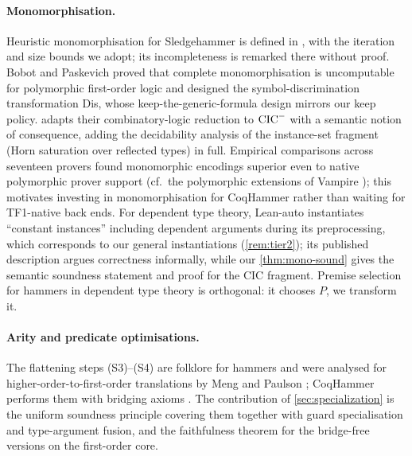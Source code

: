 \paragraph{Monomorphisation.}
Heuristic monomorphisation for Sledgehammer is defined in
\cite[\S5.6, \S7.1]{Blanchette2016}, with the iteration and size
bounds we adopt; its incompleteness is remarked there without
proof.  Bobot and Paskevich \cite{BobotPaskevich2011} proved that
complete monomorphisation is uncomputable for polymorphic
first-order logic and designed the symbol-discrimination
transformation \textsf{Dis}, whose keep-the-generic-formula design
mirrors our keep policy.   adapts their
combinatory-logic reduction to $\mathrm{CIC}^{-}$ with a semantic notion of
consequence, adding the decidability analysis of the instance-set
fragment (Horn saturation over reflected types) in full.  Empirical
comparisons across seventeen provers \cite{Desharnais2022} found
monomorphic encodings superior even to native polymorphic prover
support (cf.\ the polymorphic extensions of Vampire
\cite{BhayatReger2020}); this motivates investing in
monomorphisation for CoqHammer rather than waiting for TF1-native
back ends.  For dependent type theory, Lean-auto
\cite{QianEtAl2025} instantiates ``constant instances'' including
dependent arguments during its preprocessing, which corresponds to
our general instantiations (\cref{rem:tier2}); its published
description argues correctness informally, while our
\cref{thm:mono-sound} gives the semantic soundness statement and
proof for the CIC fragment.  Premise selection for hammers in
dependent type theory \cite{ZhuEtAl2025} is orthogonal: it chooses
$P$, we transform it.

\paragraph{Arity and predicate optimisations.}
The flattening steps (S3)--(S4) are folklore for hammers and were
analysed for higher-order-to-first-order translations by Meng and
Paulson \cite{MengPaulson2008}; CoqHammer performs them with
bridging axioms \cite[\S5.5]{CzajkaKaliszyk2018}.  The contribution
of \cref{sec:specialization} is the uniform soundness principle
covering them together with guard specialisation and type-argument
fusion, and the faithfulness theorem for the bridge-free versions
on the first-order core.
